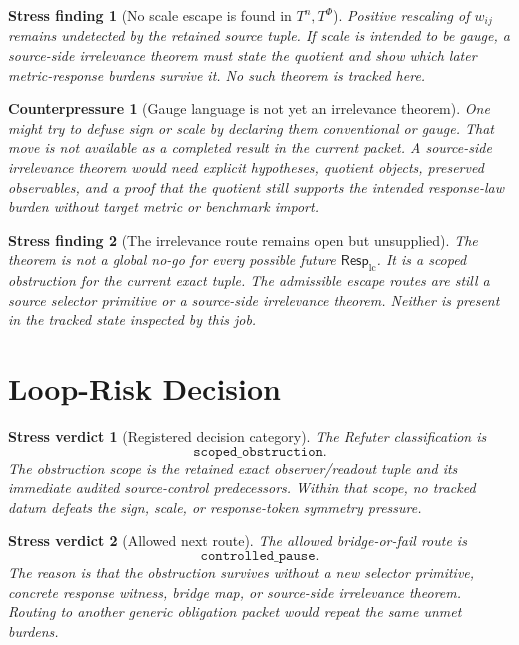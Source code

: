 \documentclass[11pt]{article}
\newcommand{\RespLC}{\mathsf{Resp}_{\mathrm{lc}}}
\newtheorem{counterpressure}{Counterpressure}
\newtheorem{stressfinding}{Stress finding}
\newtheorem{verdict}{Stress verdict}
\begin{document}
\begin{stressfinding}[No scale escape is found in \(T^n,T^\Phi\)]
Positive rescaling of \(w_{ij}\) remains undetected by the retained
source tuple. If scale is intended to be gauge, a source-side
irrelevance theorem must state the quotient and show which later
metric-response burdens survive it. No such theorem is tracked here.
\end{stressfinding}

\begin{counterpressure}[Gauge language is not yet an irrelevance theorem]
One might try to defuse sign or scale by declaring them conventional
or gauge. That move is not available as a completed result in the
current packet. A source-side irrelevance theorem would need explicit
hypotheses, quotient objects, preserved observables, and a proof that
the quotient still supports the intended response-law burden without
target metric or benchmark import.
\end{counterpressure}

\begin{stressfinding}[The irrelevance route remains open but unsupplied]
The theorem is not a global no-go for every possible future
\(\RespLC\). It is a scoped obstruction for the current exact tuple.
The admissible escape routes are still a source selector primitive or
a source-side irrelevance theorem. Neither is present in the tracked
state inspected by this job.
\end{stressfinding}

\section{Loop-Risk Decision}

\begin{verdict}[Registered decision category]
The Refuter classification is
\[
\texttt{scoped\_obstruction}.
\]
The obstruction scope is the retained exact observer/readout tuple and
its immediate audited source-control predecessors. Within that scope,
no tracked datum defeats the sign, scale, or response-token symmetry
pressure.
\end{verdict}

\begin{verdict}[Allowed next route]
The allowed bridge-or-fail route is
\[
\texttt{controlled\_pause}.
\]
The reason is that the obstruction survives without a new selector
primitive, concrete response witness, bridge map, or source-side
irrelevance theorem. Routing to another generic obligation packet
would repeat the same unmet burdens.
\end{verdict}
\end{document}
